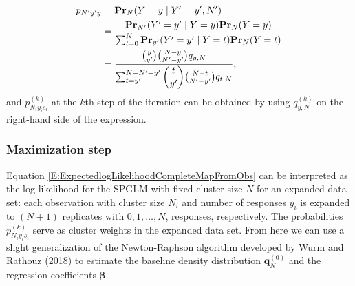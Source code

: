 \documentclass[reqno]{amsart}
\begin{document}
\begin{equation}\label{D:prst}
\begin{split}
p_{N'y'y} &= \textbf{Pr}_N(Y=y \mid Y'=y',N') \\ 
          &= \frac{\textbf{Pr}_{N'}(Y'=y' \mid Y=y) \textbf{Pr}_N(Y=y)}{\sum_{t=0}^{N} \textbf{Pr}_{y'}(Y'=y' \mid Y=t) \textbf{Pr}_N(Y=t)} \\ 
          &= \frac{\binom{y}{y'} \binom{N-y}{N'-y'} q_{y,N}}{\sum_{t=y'}^{N-N'+y'} \dbinom{t}{y'} \binom{N-t}{N'-y'} q_{t,N}},
\end{split}
\end{equation}
and $p_{N_iy_is_i}^{(k)}$ at the $k$th step of the iteration can be obtained by using $q_{y,N}^{(k)}$ on the right-hand side of the expression.




\subsubsection{Maximization step}

Equation \eqref{E:ExpectedlogLikelihoodCompleteMapFromObs} can be interpreted as the log-likelihood for the SPGLM with fixed cluster size $N$ for an expanded data set: each observation with cluster size $N_i$ and number of responses $y_i$ is expanded to $(N+1)$ replicates with $0, 1, \ldots, N$, responses, respectively. The probabilities $p_{N_iy_is_i}^{(k)}$ serve as cluster weights in the expanded data set. From here we can use a slight generalization of the Newton-Raphson algorithm developed by Wurm and Rathouz (2018) to estimate the baseline density distribution $ \boldsymbol{q}_N^{(0)} $ and the regression coefficients $\boldsymbol{\beta}$. 
\end{document}
